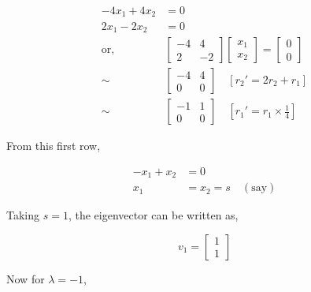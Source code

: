 \documentclass{article}
\begin{document}
    \[
    \begin{aligned}
        -4x_1 + 4x_2 &= 0 \\
        2x_1 - 2x_2 &= 0 \\
        \text{or,} \quad &\begin{bmatrix}
            -4 & 4 \\
            2 & -2
        \end{bmatrix} \begin{bmatrix}
            x_1 \\
            x_2
        \end{bmatrix} = \begin{bmatrix}
            0 \\
            0
        \end{bmatrix} \\
        \sim \quad &\begin{bmatrix}
            -4 & 4 \\
            0 & 0
        \end{bmatrix} \quad [r_2' = 2r_2 + r_1] \\
        \sim \quad &\begin{bmatrix}
            -1 & 1 \\
            0 & 0
        \end{bmatrix} \quad [r_1' = r_1 \times \frac{1}{4}]
    \end{aligned}
    \]
    
    \vspace{10pt}
    From this first row,
    
    \[
    \begin{aligned}
        -x_1 + x_2 &= 0 \\
        x_1 &= x_2 = s \quad (\text{say})
    \end{aligned}
    \]
    
    Taking \(s = 1\), the eigenvector can be written as,
    
    \[
    v_1 = \begin{bmatrix}
        1 \\
        1
    \end{bmatrix}
    \]
    
    Now for \(\lambda = -1\),
    
\end{document}
